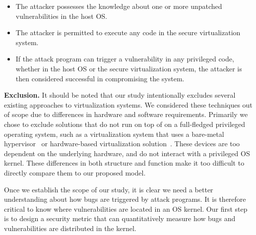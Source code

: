 \begin{itemize}\setlength\itemsep{0em}

\item The attacker possesses the knowledge about one or more unpatched vulnerabilities in the host OS.

\item The attacker is permitted to execute any code in the secure virtualization system.

\item If the attack program can trigger a vulnerability in any privileged code,
whether in the host OS or the secure virtualization system, the attacker is then considered successful
in compromising the system.

\end{itemize}

\noindent
\textbf{Exclusion.}
It should be noted that our study intentionally excludes several existing
approaches to virtualization systems. We considered these techniques
out of scope due to differences in hardware and software requirements.
Primarily we chose to exclude solutions that do not run on top of on a full-fledged
privileged operating system, such as a virtualization system that uses a
bare-metal hypervisor~\cite{Xen-03} or hardware-based virtualization
solution~\cite{IntelVT}.
These devices are too dependent on the underlying hardware, and do not interact
with a privileged OS kernel. These differences in both structure and function
make it too difficult to directly compare them to our proposed model.

Once we establish the scope of our study, it is clear we need a better understanding about how
bugs are triggered by attack programs. It is therefore critical to know where
vulnerabilities are located in an OS kernel. Our first step is to design
a security metric that can quantitatively measure how bugs and vulnerabilities
are distributed in the kernel.
